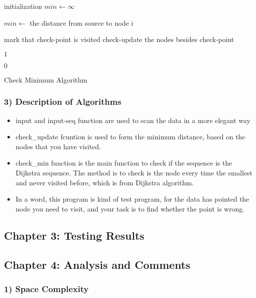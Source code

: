 \documentclass{article}
\begin{document}
\begin{algorithm}[H]
	\SetAlgoLined

	initialization\;
	{$min\leftarrow \infty$}

	{
		{
			{$min\leftarrow$ the distance from source to node i}
		}
	}
	{
		mark that check-point is visited
		check-update the nodes besides check-point

		\Return $1$
	}
	\Return $0$
	\caption{Check Minimum Algorithm}
\end{algorithm}

\subsubsection*{3) Description of Algorithms}

\begin{itemize}
	\item input and input-seq function are used to scan the data in a more elegant way
	\item check\_update fcuntion is used to form the minimum distance, based on the nodes that you have visited.
	\item check\_min function is the main function to check if the sequence is the Dijkstra sequence. The method is to check is the node every time the smallest and never visited before, which is from Dijkstra algorithm.
	\item In a word, this program is kind of test program, for the data has pointed the node you need to visit, and your task is to find whether the point is wrong.

\end{itemize}

\subsection*{\bf Chapter 3: Testing Results}


\subsection*{\bf Chapter 4: Analysis and Comments}

\subsubsection*{1) Space Complexity}
\end{document}
